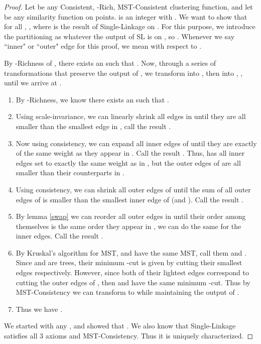 \documentclass[twoside,11pt]{article}
\begin{document}
\begin{proof}

Let  be any Consistent, -Rich, MST-Consistent clustering function, and let  be any similarity function on  points.  is an integer with . We want to show that for all , , where  is the result of Single-Linkage on . For this purpose, we introduce the partitioning  as whatever the output of SL is on , so . Whenever we say ``inner" or ``outer" edge for this proof, we mean with respect to .

By -Richness of , there exists an  such that . Now, through a series of transformations that preserve the output of , we transform  into , then  into , , until we arrive at .
\begin{enumerate}
	\item By -Richness, we know there exists an  such that .
	\item Using scale-invariance, we can linearly shrink all edges in  until they are all smaller than the smallest edge in , call the result .
	\item Now using consistency, we can expand all inner edges of  until they are exactly of the same weight as they appear in . Call the result . Thus,  has all inner edges set to exactly the same weight as in , but the outer edges of  are all smaller than their counterparts in .
	\item Using consistency, we can shrink all outer edges of  until the sum of all outer edges of  is smaller than the smallest inner edge of  (and ). Call the result .
	\item By lemma \ref{swap} we can reorder all outer edges in  until their order among themselves is the same order they appear in , we can do the same for the inner edges. Call the result .	
	\item By Kruskal's algorithm for MST,  and  have the same MST, call them  and . Since  and  are trees, their minimum -cut is given by cutting their  smallest edges respectively.
However, since both of their  lightest edges correspond to cutting the outer edges of , then  and  have the same minimum -cut. Thus
by MST-Consistency we can transform  to  while maintaining the output of .
	\item Thus we have .
\end{enumerate}
We started with any , and showed that .
We also know that Single-Linkage satisfies all 3 axioms \citep{bosagh2009} and MST-Consistency. Thus
it is uniquely characterized.
\end{proof}
\end{document}
